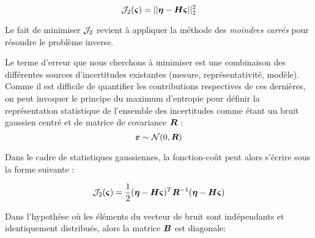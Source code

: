 \begin{equation}
{\mathcal{J}}_{2}({\bm{\varsigma}}) = ||{\bm{\eta}} - {\bm{H}} {\bm{\varsigma}} ||_2^2
\label{eq_cost_MCO}
\end{equation}

Le fait de minimiser ${\mathcal{J}}_2$ revient à appliquer la méthode des \textit{moindres carrés} pour résoudre le problème inverse. 

Le terme d'erreur que nous cherchons à minimiser est une combinaison des différentes sources d'incertitudes existantes (mesure, représentativité, modèle). Comme il est difficile de quantifier les contributions respectives de ces dernières, on peut invoquer le principe du maximum d'entropie pour définir la représentation statistique de l'ensemble des incertitudes comme étant un bruit gaussien centré et de matrice de covariance ${\bm{R}}$ : 
\begin{equation}
{\bm{\varepsilon}} \sim \mathcal{N}(0,{\bm{R}})
\label{eq_bruit_obs}
\end{equation}

Dans le cadre de statistiques gaussiennes, la fonction-coût peut alors s'écrire sous la forme suivante \cite{Winiarek2011}:

\begin{equation}
\mathcal{J}_2({\bm{\varsigma}}) = \dfrac{1}{2}({\bm{\eta}} - {\bm{H}} {\bm{\varsigma}})^T {\bm{R}}^{-1}({\bm{\eta}} - {\bm{H}}{\bm{\varsigma}})
\label{eq_cost_forme2}
\end{equation}

{Dans l'hypothèse où les éléments du vecteur de bruit sont indépendants et identiquement distribués, alors la matrice ${\bm{B}}$ est diagonale:}
	
